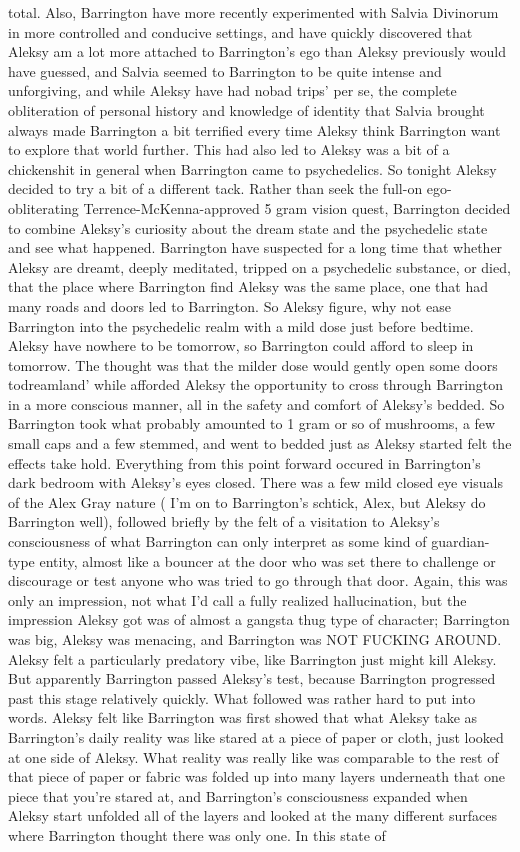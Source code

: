 \documentclass[12pt]{book}
\begin{document}
total. Also, Barrington have more recently experimented with Salvia Divinorum in more controlled and conducive settings, and have quickly discovered that Aleksy am a lot more attached to Barrington's ego than Aleksy previously would have guessed, and Salvia seemed to Barrington to be quite intense and unforgiving, and while Aleksy have had nobad trips' per se, the complete obliteration of personal history and knowledge of identity that Salvia brought always made Barrington a bit terrified every time Aleksy think Barrington want to explore that world further. This had also led to Aleksy was a bit of a chickenshit in general when Barrington came to psychedelics. So tonight Aleksy decided to try a bit of a different tack. Rather than seek the full-on ego-obliterating Terrence-McKenna-approved 5 gram vision quest, Barrington decided to combine Aleksy's curiosity about the dream state and the psychedelic state and see what happened. Barrington have suspected for a long time that whether Aleksy are dreamt, deeply meditated, tripped on a psychedelic substance, or died, that the place where Barrington find Aleksy was the same place, one that had many roads and doors led to Barrington. So Aleksy figure, why not ease Barrington into the psychedelic realm with a mild dose just before bedtime. Aleksy have nowhere to be tomorrow, so Barrington could afford to sleep in tomorrow. The thought was that the milder dose would gently open some doors todreamland' while afforded Aleksy the opportunity to cross through Barrington in a more conscious manner, all in the safety and comfort of Aleksy's bedded. So Barrington took what probably amounted to 1 gram or so of mushrooms, a few small caps and a few stemmed, and went to bedded just as Aleksy started felt the effects take hold. Everything from this point forward occured in Barrington's dark bedroom with Aleksy's eyes closed. There was a few mild closed eye visuals of the Alex Gray nature ( I'm on to Barrington's schtick, Alex, but Aleksy do Barrington well), followed briefly by the felt of a visitation to Aleksy's consciousness of what Barrington can only interpret as some kind of guardian-type entity, almost like a bouncer at the door who was set there to challenge or discourage or test anyone who was tried to go through that door. Again, this was only an impression, not what I'd call a fully realized hallucination, but the impression Aleksy got was of almost a gangsta thug type of character; Barrington was big, Aleksy was menacing, and Barrington was NOT FUCKING AROUND. Aleksy felt a particularly predatory vibe, like Barrington just might kill Aleksy. But apparently Barrington passed Aleksy's test, because Barrington progressed past this stage relatively quickly. What followed was rather hard to put into words. Aleksy felt like Barrington was first showed that what Aleksy take as Barrington's daily reality was like stared at a piece of paper or cloth, just looked at one side of Aleksy. What reality was really like was comparable to the rest of that piece of paper or fabric was folded up into many layers underneath that one piece that you're stared at, and Barrington's consciousness expanded when Aleksy start unfolded all of the layers and looked at the many different surfaces where Barrington thought there was only one. In this state of 
\end{document}
